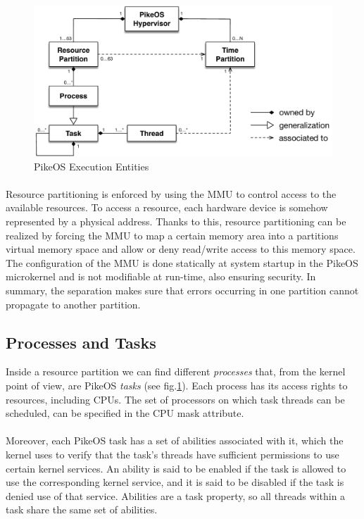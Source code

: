 \begin{figure}[htbp] 
\centering    
\includegraphics[width=1.0\textwidth]{PikeosExecEntities}
\caption{PikeOS Execution Entities}
\label{fig:pikeosExecEntities}
\end{figure}

\paragraph{} Resource partitioning is enforced by using the MMU to control access to the available resources. To access a resource, each hardware device is somehow represented by a physical address. Thanks to this, resource partitioning can be realized by forcing the MMU to map a certain memory area into a partitions virtual memory space and allow or deny read/write access to this memory space. The configuration of the MMU is done statically at system startup in the PikeOS microkernel and is not modifiable at run-time, also ensuring security. In summary, the separation makes sure that errors occurring in one partition cannot propagate to another partition.

\subsection{Processes and Tasks}
Inside a resource partition we can find different \emph{processes} that, from the kernel point of view, are PikeOS \emph{tasks} (see fig.\ref{fig:pikeosExecEntities}). Each process has its access rights to resources, including CPUs. The set of processors on which task threads can be scheduled, can be specified in the CPU mask attribute. 

\paragraph{} Moreover, each PikeOS task has a set of abilities associated with it, which the kernel uses to verify that the task’s threads have sufficient permissions to use certain kernel services. An ability is said to be enabled if the task is allowed to use the corresponding kernel service, and it is said to be disabled if the task is denied use of that service. Abilities are a task property, so all threads within a task share the same set of abilities.

